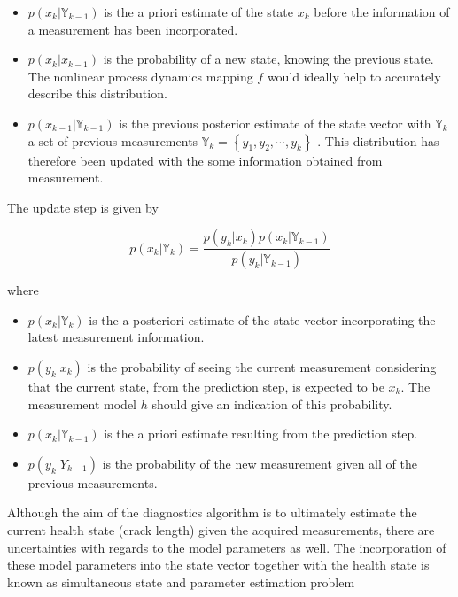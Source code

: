 \begin{itemize}
	\item $p\left(x_{k} | \mathbb{Y}_{k-1}\right)$ is the a priori estimate of the state $x_k$ before the information of a measurement has been incorporated. 
	\item $p\left(x_{k} | x_{k-1}\right)$ is the probability of a new state, knowing the previous state. The nonlinear process dynamics mapping $f$ would ideally help to accurately describe this distribution.
	\item $p\left(x_{k-1} | \mathbb{Y}_{k-1}\right)$ is the previous posterior estimate of the state vector with $\mathbb{Y}_{k}$ a set of previous measurements $\mathbb{Y}_{k}=\left\{y_{1}, y_{2}, \cdots, y_{k}\right\}$ . This distribution has therefore been updated with the some information obtained from measurement. 
\end{itemize}

The update step is given by

\begin{equation}
p\left(x_{k} | \mathbb{Y}_{k}\right)=\frac{p\left(y_{k} | x_{k}\right) p\left(x_{k} | \mathbb{Y}_{k-1}\right)}{p\left(y_{k} | \mathbb{Y}_{k-1}\right)}
\end{equation}

where 

\begin{itemize}
	\item  $p\left(x_{k} | \mathbb{Y}_{k}\right)$ is the a-posteriori estimate of the state vector incorporating the latest measurement information. 
	\item $p\left(y_{k} | x_{k}\right)$ is the probability of seeing the current measurement considering that the current state, from the prediction step, is expected to be $x_k$. The measurement model $h$ should give an indication of this probability. 
	\item $p\left(x_{k} | \mathbb{Y}_{k-1}\right)$ is the a priori estimate resulting from the prediction step.
	\item $p\left(y_{k} | Y_{k-1}\right)$ is the probability of the new measurement given all of the previous measurements. 
\end{itemize}


Although the aim of the diagnostics algorithm is to ultimately estimate the current health state (crack length) given the acquired measurements, there are uncertainties with regards to the model parameters as well. The incorporation of these model parameters into the state vector together with the health state is known as simultaneous state and parameter estimation problem\cite{Fang2018}

